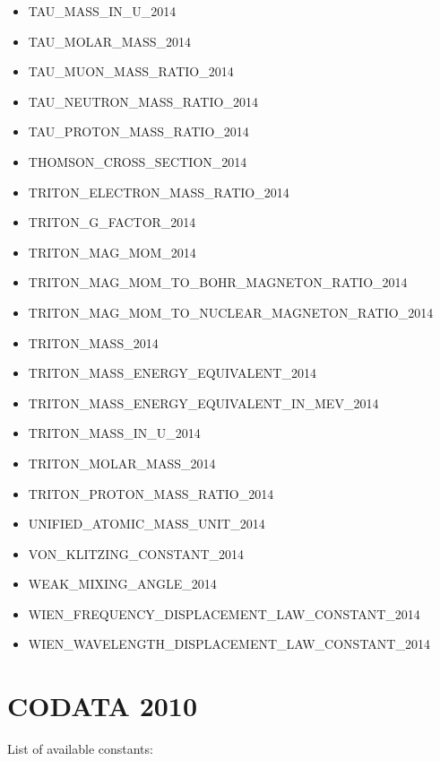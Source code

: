 \begin{itemize}
\item TAU\_MASS\_IN\_U\_2014
\item TAU\_MOLAR\_MASS\_2014
\item TAU\_MUON\_MASS\_RATIO\_2014
\item TAU\_NEUTRON\_MASS\_RATIO\_2014
\item TAU\_PROTON\_MASS\_RATIO\_2014
\item THOMSON\_CROSS\_SECTION\_2014
\item TRITON\_ELECTRON\_MASS\_RATIO\_2014
\item TRITON\_G\_FACTOR\_2014
\item TRITON\_MAG\_MOM\_2014
\item TRITON\_MAG\_MOM\_TO\_BOHR\_MAGNETON\_RATIO\_2014
\item TRITON\_MAG\_MOM\_TO\_NUCLEAR\_MAGNETON\_RATIO\_2014
\item TRITON\_MASS\_2014
\item TRITON\_MASS\_ENERGY\_EQUIVALENT\_2014
\item TRITON\_MASS\_ENERGY\_EQUIVALENT\_IN\_MEV\_2014
\item TRITON\_MASS\_IN\_U\_2014
\item TRITON\_MOLAR\_MASS\_2014
\item TRITON\_PROTON\_MASS\_RATIO\_2014
\item UNIFIED\_ATOMIC\_MASS\_UNIT\_2014
\item VON\_KLITZING\_CONSTANT\_2014
\item WEAK\_MIXING\_ANGLE\_2014
\item WIEN\_FREQUENCY\_DISPLACEMENT\_LAW\_CONSTANT\_2014
\item WIEN\_WAVELENGTH\_DISPLACEMENT\_LAW\_CONSTANT\_2014
\end{itemize}

\section*{CODATA 2010}
List of available constants:

